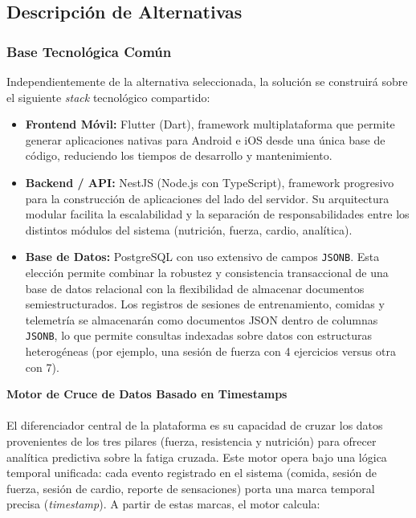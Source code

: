 \documentclass[12pt]{article}
\begin{document}
\subsection{Descripción de Alternativas}
\subsubsection{Base Tecnológica Común}

Independientemente de la alternativa seleccionada, la solución se construirá sobre el siguiente \textit{stack} tecnológico compartido:

\begin{itemize}
    \item \textbf{Frontend Móvil:} Flutter (Dart), framework multiplataforma que permite generar aplicaciones nativas para Android e iOS desde una única base de código, reduciendo los tiempos de desarrollo y mantenimiento.
    \item \textbf{Backend / API:} NestJS (Node.js con TypeScript), framework progresivo para la construcción de aplicaciones del lado del servidor. Su arquitectura modular facilita la escalabilidad y la separación de responsabilidades entre los distintos módulos del sistema (nutrición, fuerza, cardio, analítica).
    \item \textbf{Base de Datos:} PostgreSQL con uso extensivo de campos \texttt{JSONB}. Esta elección permite combinar la robustez y consistencia transaccional de una base de datos relacional con la flexibilidad de almacenar documentos semiestructurados. Los registros de sesiones de entrenamiento, comidas y telemetría se almacenarán como documentos JSON dentro de columnas \texttt{JSONB}, lo que permite consultas indexadas sobre datos con estructuras heterogéneas (por ejemplo, una sesión de fuerza con 4 ejercicios versus otra con 7).
\end{itemize}

\textbf{Motor de Cruce de Datos Basado en Timestamps}
\\\\
El diferenciador central de la plataforma es su capacidad de cruzar los datos provenientes de los tres pilares (fuerza, resistencia y nutrición) para ofrecer analítica predictiva sobre la fatiga cruzada. Este motor opera bajo una lógica temporal unificada: cada evento registrado en el sistema (comida, sesión de fuerza, sesión de cardio, reporte de sensaciones) porta una marca temporal precisa (\textit{timestamp}). A partir de estas marcas, el motor calcula:
\end{document}
